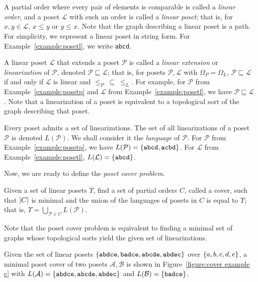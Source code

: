 \documentclass[12pt]{llncs}
\DeclarePairedDelimiter{\set}{\{}{\}}
\DeclarePairedDelimiter{\abs}{\lvert}{\rvert}
\let\oldleq\leq
\renewcommand{\leq}[1][]{\oldleq_{#1}}
\newcommand{\poset}[1]{\mathcal{#1}}
\newcommand{\uni}[1][]{\Omega_{#1}}
\newcommand{\lang}[1]{L(#1)}
\newcommand{\lin}[1]{\texttt{#1}}
\newcommand{\lext}{\sqsubseteq}
\begin{document}
A partial order where every pair of elements is comparable is called a \emph{linear order}, and a poset $\poset{L}$ with such an order is called a \emph{linear poset}; that is, for $x, y \!\in\! \poset{L}$, $x \leq y$ or $y \leq x$. Note that the graph describing a linear poset is a path. For simplicity, we represent a linear poset in string form. For Example~\ref{example:posetl}, we write \lin{abcd}.

A linear poset $\poset{L}$ that extends a poset $\poset{P}$ is called a \emph{linear extension} or \emph{linearization} of $\poset{P}$, denoted $\poset{P} \lext \poset{L}$; that is, for posets $\poset{P},\poset{L}$ with $\uni[P] \!=\! \uni[L]$, $\poset{P} \lext \poset{L}$ if and only if $\poset{L}$ is linear and $\leq[P] \>\subseteq\> \leq[L]$. For example, for $\poset{P}$ from Example~\ref{example:posetp} and $\poset{L}$ from Example~\ref{example:posetl}, we have $\poset{P} \lext \poset{L}$. Note that a linearization of a poset is equivalent to a topological sort of the graph describing that poset.

Every poset admits a set of linearizations. The set of all linearizations of a poset $\poset{P}$ is denoted $\lang{\poset{P}}$. We shall consider it the \emph{language} of $\poset{P}$. For $\poset{P}$ from Example~\ref{example:posetp}, we have $\lang{\poset{P}} = \set{\lin{abcd},\lin{acbd}}$. For $\poset{L}$ from Example~\ref{example:posetl}, $\lang{\poset{L}} = \set{\lin{abcd}}$.

Now, we are ready to define the \emph{poset cover problem}.

\begin{definition}
    Given a set of linear posets $\Upsilon$, find a set of partial orders $C$, called a cover, such that $\abs{C}$ is minimal and the union of the languages of posets in $C$ is equal to $\Upsilon$; that is, $\Upsilon = \bigcup_{\poset{P} \in C} \lang{\poset{P}}$.

    Note that the poset cover problem is equivalent to finding a minimal set of graphs whose topological sorts yield the given set of linearizations.
    \label{definition:pcp}
\end{definition}

\begin{example}
    Given the set of linear posets $\set{\lin{abdce},\lin{badce},\lin{abcde},\lin{abdec}}$ over $\set{a,b,c,d,e}$, a minimal poset cover of two posets $\poset{A},\poset{B}$ is shown in Figure~\ref{figure:cover example c} with ${\lang{\poset{A}} = \set{\lin{abdce},\lin{abcde},\lin{abdec}}}$ and ${\lang{\poset{B}} = \set{\lin{badce}}}$.
    \label{example:cover example}
\end{example}
\end{document}
